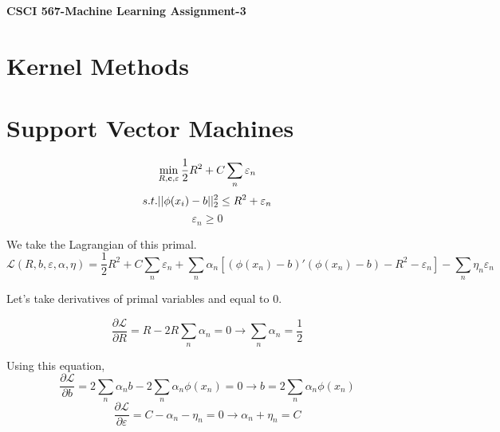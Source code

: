 \documentclass[letter,11pt]{article}
\begin{document}
	\begin{center}
		\Large\textbf{CSCI 567-Machine Learning Assignment-3}
	\end{center}
	
	\section{Kernel Methods}
	
	\section{Support Vector Machines}


	\begin{equation}
		 \min_{R,\textbf{c},\varepsilon}\frac{1}{2}R^2 + C\sum_{n}\varepsilon_n \\
	\end{equation}
	\begin{equation}
		s.t. ||\phi(x_i) - b||_2^2 \leq R^2 + \varepsilon_n \\
	\end{equation}
	\begin{equation}
		\varepsilon_n \geq 0
	\end{equation}
	
	We take the Lagrangian of this primal.
	\begin{equation}
	 \mathcal{L}(R,b,\varepsilon,\alpha,\eta) = \frac{1}{2}R^2 + C \sum_{n} \varepsilon_n + \sum_{n} \alpha_n[(\phi(x_n)-b)'(\phi(x_n)-b)-R^2-\varepsilon_n] - \sum_{n}\eta_n\varepsilon_n 
	\end{equation}
	
	Let's take derivatives of primal variables and equal to 0.
	
	\begin{equation}
	\frac{\partial \mathcal{L}}{\partial R} = R - 2R \sum_{n} \alpha_n = 0 \rightarrow \sum_{n} \alpha_n = \frac{1}{2}
	\end{equation}
	
	Using this equation,
	\begin{equation}
	\frac{\partial \mathcal{L}}{\partial b} = 2 \sum_{n} \alpha_n b - 2 \sum_{n} \alpha_n \phi(x_n) = 0 \rightarrow b = 2\sum_{n} \alpha_n \phi(x_n)
	\end{equation}
	\begin{equation}
	\frac{\partial \mathcal{L}}{\partial \varepsilon} = C - \alpha_n - \eta_n = 0 \rightarrow \alpha_n + \eta_n = C
	\end{equation}
	
\end{document}
